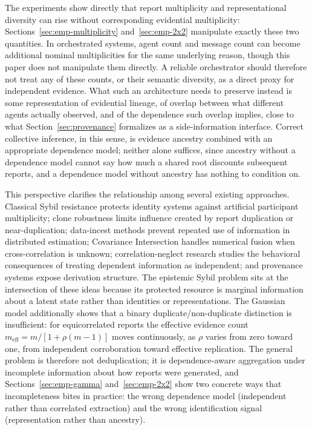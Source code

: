 \documentclass[11pt]{article}
\theoremstyle{definition}
\begin{document}
The experiments show directly that report multiplicity and representational diversity can rise without corresponding evidential multiplicity: Sections~\ref{sec:emp-multiplicity} and~\ref{sec:emp-2x2} manipulate exactly these two quantities. In orchestrated systems, agent count and message count can become additional nominal multiplicities for the same underlying reason, though this paper does not manipulate them directly. A reliable orchestrator should therefore not treat any of these counts, or their semantic diversity, as a direct proxy for independent evidence. What such an architecture needs to preserve instead is some representation of evidential lineage, of overlap between what different agents actually observed, and of the dependence such overlap implies, close to what Section~\ref{sec:provenance} formalizes as a side-information interface. Correct collective inference, in this sense, is evidence ancestry combined with an appropriate dependence model; neither alone suffices, since ancestry without a dependence model cannot say how much a shared root discounts subsequent reports, and a dependence model without ancestry has nothing to condition on.

This perspective clarifies the relationship among several existing approaches. Classical Sybil resistance protects identity systems against artificial participant multiplicity; clone robustness limits influence created by report duplication or near-duplication; data-incest methods prevent repeated use of information in distributed estimation; Covariance Intersection handles numerical fusion when cross-correlation is unknown; correlation-neglect research studies the behavioral consequences of treating dependent information as independent; and provenance systems expose derivation structure. The epistemic Sybil problem sits at the intersection of these ideas because its protected resource is marginal information about a latent state rather than identities or representations. The Gaussian model additionally shows that a binary duplicate/non-duplicate distinction is insufficient: for equicorrelated reports the effective evidence count $m_{\mathrm{eff}}=m/[1+\rho(m-1)]$ moves continuously, as $\rho$ varies from zero toward one, from independent corroboration toward effective replication. The general problem is therefore not deduplication; it is dependence-aware aggregation under incomplete information about how reports were generated, and Sections~\ref{sec:emp-gamma} and~\ref{sec:emp-2x2} show two concrete ways that incompleteness bites in practice: the wrong dependence model (independent rather than correlated extraction) and the wrong identification signal (representation rather than ancestry).
\end{document}
